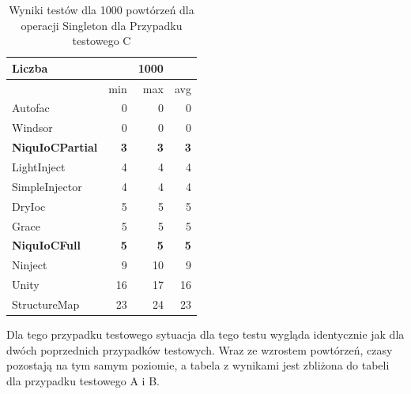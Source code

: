 \documentclass[12pt]{article}
\begin{document}
\begin{table}[H]
\captionsetup{belowskip=0pt,aboveskip=0pt}
\begin{center}
\begin{small}
	\begin{tabular}{ | l | r r r | }
    		\hline
Liczba & & 1000 & \\ \hline
 & min & max & avg \\ \hline
Autofac & 0 & 0 & 0 \\ \hline
Windsor & 0 & 0 & 0 \\ \hline
\textbf{NiquIoCPartial} & \textbf{3} & \textbf{3} & \textbf{3} \\ \hline
LightInject & 4 & 4 & 4 \\ \hline
SimpleInjector & 4 & 4 & 4 \\ \hline
DryIoc & 5 & 5 & 5 \\ \hline
Grace & 5 & 5 & 5 \\ \hline
\textbf{NiquIoCFull} & \textbf{5} & \textbf{5} & \textbf{5} \\ \hline
Ninject & 9 & 10 & 9 \\ \hline
Unity & 16 & 17 & 16 \\ \hline
StructureMap & 23 & 24 & 23 \\ \hline
  	\end{tabular}
\end{small}
\end{center}
\caption{Wyniki testów dla 1000 powtórzeń dla operacji Singleton dla Przypadku testowego C}
\label{TestCaseC_Singleton1000}
\end{table}
Dla tego przypadku testowego sytuacja dla tego testu wygląda identycznie jak dla dwóch poprzednich przypadków testowych. Wraz ze wzrostem powtórzeń, czasy pozostają na tym samym poziomie, a tabela z wynikami jest zbliżona do tabeli dla przypadku testowego A i B.
\end{document}
